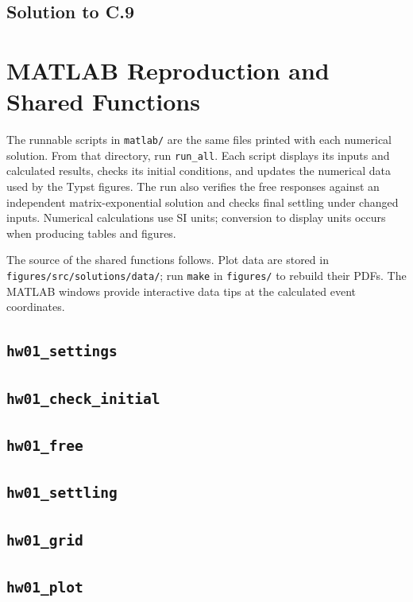 \documentclass[11pt]{article}
\begin{document}
\subsection*{Solution to C.9}

\clearpage
\section{MATLAB Reproduction and Shared Functions}
The runnable scripts in \texttt{matlab/} are the same files printed with each numerical solution. From that directory, run \texttt{run\_all}. Each script displays its inputs and calculated results, checks its initial conditions, and updates the numerical data used by the Typst figures. The run also verifies the free responses against an independent matrix-exponential solution and checks final settling under changed inputs. Numerical calculations use SI units; conversion to display units occurs when producing tables and figures.

The source of the shared functions follows. Plot data are stored in \texttt{figures/src/solutions/data/}; run \texttt{make} in \texttt{figures/} to rebuild their PDFs. The MATLAB windows provide interactive data tips at the calculated event coordinates.
\subsection*{\texttt{hw01\_settings}}

\subsection*{\texttt{hw01\_check\_initial}}

\clearpage
\subsection*{\texttt{hw01\_free}}

\clearpage
\subsection*{\texttt{hw01\_settling}}

\subsection*{\texttt{hw01\_grid}}

\clearpage
\subsection*{\texttt{hw01\_plot}}

\clearpage


\end{document}
